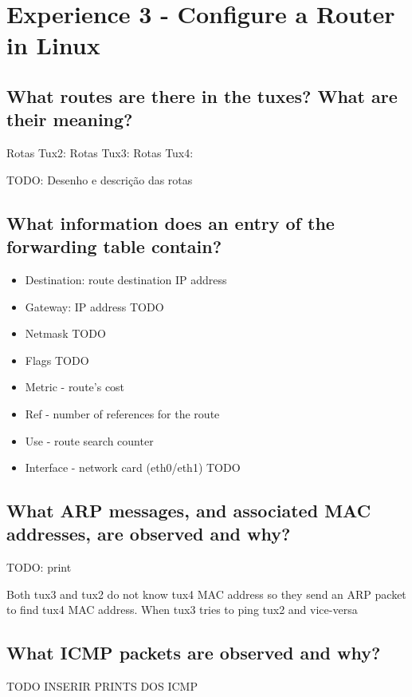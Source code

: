 \documentclass[11pt]{report}
\begin{document}
\newpage

\section{Experience 3 - Configure a Router in Linux}

\subsection{What routes are there in the tuxes? What are their meaning?}

Rotas Tux2:
Rotas Tux3:
Rotas Tux4:

TODO: Desenho e descrição das rotas

\subsection{What information does an entry of the forwarding table contain?}

\begin{itemize}
    \item Destination: route destination IP address
    \item Gateway: IP address TODO
    \item Netmask TODO
    \item Flags TODO
    \item Metric - route's cost
    \item Ref - number of references for the route
    \item Use - route search counter
    \item Interface - network card (eth0/eth1) TODO
\end{itemize}

\subsection{What ARP messages, and associated MAC addresses, are observed and
why?}

TODO: print

Both tux3 and tux2 do not know tux4 MAC address so they send an ARP packet to find tux4 MAC address. When tux3 tries to ping tux2 and vice-versa

\subsection{What ICMP packets are observed and why?}

TODO INSERIR PRINTS DOS ICMP
\end{document}
